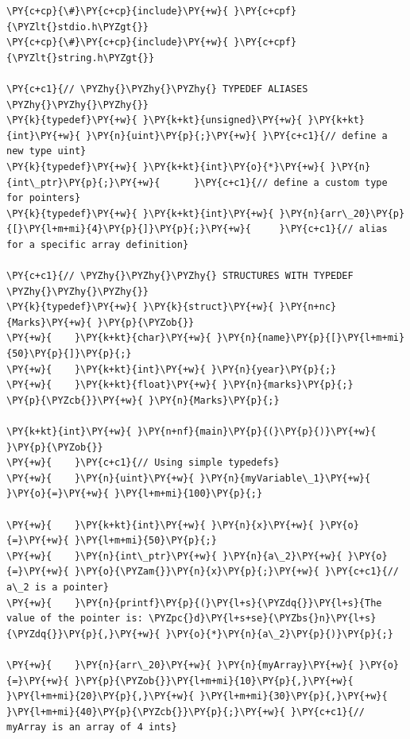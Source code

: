 \begin{Verbatim}[label=\makebox{\url{https://github.com/lucabaldini/cmepda/tree/master/slides/latex/snippets/typedef_and_structs.c}},commandchars=\\\{\}]
\PY{c+cp}{\#}\PY{c+cp}{include}\PY{+w}{ }\PY{c+cpf}{\PYZlt{}stdio.h\PYZgt{}}
\PY{c+cp}{\#}\PY{c+cp}{include}\PY{+w}{ }\PY{c+cpf}{\PYZlt{}string.h\PYZgt{}}

\PY{c+c1}{// \PYZhy{}\PYZhy{}\PYZhy{} TYPEDEF ALIASES \PYZhy{}\PYZhy{}\PYZhy{}}
\PY{k}{typedef}\PY{+w}{ }\PY{k+kt}{unsigned}\PY{+w}{ }\PY{k+kt}{int}\PY{+w}{ }\PY{n}{uint}\PY{p}{;}\PY{+w}{ }\PY{c+c1}{// define a new type uint}
\PY{k}{typedef}\PY{+w}{ }\PY{k+kt}{int}\PY{o}{*}\PY{+w}{ }\PY{n}{int\_ptr}\PY{p}{;}\PY{+w}{      }\PY{c+c1}{// define a custom type for pointers}
\PY{k}{typedef}\PY{+w}{ }\PY{k+kt}{int}\PY{+w}{ }\PY{n}{arr\_20}\PY{p}{[}\PY{l+m+mi}{4}\PY{p}{]}\PY{p}{;}\PY{+w}{     }\PY{c+c1}{// alias for a specific array definition}

\PY{c+c1}{// \PYZhy{}\PYZhy{}\PYZhy{} STRUCTURES WITH TYPEDEF \PYZhy{}\PYZhy{}\PYZhy{}}
\PY{k}{typedef}\PY{+w}{ }\PY{k}{struct}\PY{+w}{ }\PY{n+nc}{Marks}\PY{+w}{ }\PY{p}{\PYZob{}}
\PY{+w}{    }\PY{k+kt}{char}\PY{+w}{ }\PY{n}{name}\PY{p}{[}\PY{l+m+mi}{50}\PY{p}{]}\PY{p}{;}
\PY{+w}{    }\PY{k+kt}{int}\PY{+w}{ }\PY{n}{year}\PY{p}{;}
\PY{+w}{    }\PY{k+kt}{float}\PY{+w}{ }\PY{n}{marks}\PY{p}{;}
\PY{p}{\PYZcb{}}\PY{+w}{ }\PY{n}{Marks}\PY{p}{;}

\PY{k+kt}{int}\PY{+w}{ }\PY{n+nf}{main}\PY{p}{(}\PY{p}{)}\PY{+w}{ }\PY{p}{\PYZob{}}
\PY{+w}{    }\PY{c+c1}{// Using simple typedefs}
\PY{+w}{    }\PY{n}{uint}\PY{+w}{ }\PY{n}{myVariable\_1}\PY{+w}{ }\PY{o}{=}\PY{+w}{ }\PY{l+m+mi}{100}\PY{p}{;}

\PY{+w}{    }\PY{k+kt}{int}\PY{+w}{ }\PY{n}{x}\PY{+w}{ }\PY{o}{=}\PY{+w}{ }\PY{l+m+mi}{50}\PY{p}{;}
\PY{+w}{    }\PY{n}{int\_ptr}\PY{+w}{ }\PY{n}{a\_2}\PY{+w}{ }\PY{o}{=}\PY{+w}{ }\PY{o}{\PYZam{}}\PY{n}{x}\PY{p}{;}\PY{+w}{ }\PY{c+c1}{// a\_2 is a pointer}
\PY{+w}{    }\PY{n}{printf}\PY{p}{(}\PY{l+s}{\PYZdq{}}\PY{l+s}{The value of the pointer is: \PYZpc{}d}\PY{l+s+se}{\PYZbs{}n}\PY{l+s}{\PYZdq{}}\PY{p}{,}\PY{+w}{ }\PY{o}{*}\PY{n}{a\_2}\PY{p}{)}\PY{p}{;}

\PY{+w}{    }\PY{n}{arr\_20}\PY{+w}{ }\PY{n}{myArray}\PY{+w}{ }\PY{o}{=}\PY{+w}{ }\PY{p}{\PYZob{}}\PY{l+m+mi}{10}\PY{p}{,}\PY{+w}{ }\PY{l+m+mi}{20}\PY{p}{,}\PY{+w}{ }\PY{l+m+mi}{30}\PY{p}{,}\PY{+w}{ }\PY{l+m+mi}{40}\PY{p}{\PYZcb{}}\PY{p}{;}\PY{+w}{ }\PY{c+c1}{// myArray is an array of 4 ints}


\end{Verbatim}
